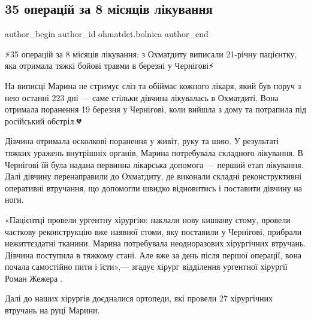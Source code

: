  
 
 
 
 
 
\subsection{35 операцій за 8 місяців лікування}
\label{sec:02_12_2022.fb.ohmatdet.bolnica.1.35_operacij_divchynka}
 
\ifcmt
 author_begin
   author_id ohmatdet.bolnica
 author_end
\fi

⚡️35 операцій за 8 місяців лікування: з Охматдиту виписали 21-річну пацієнтку,
яка отримала тяжкі бойові травми в березні у Чернігові⚡️

На виписці Марина не стримує сліз та обіймає кожного лікаря, який був поруч з
нею останні 223 дні — саме стільки дівчина лікувалась в Охматдиті. Вона
отримала поранення 19 березня у Чернігові, коли вийшла з дому та потрапила під
російський обстріл.💔

Дівчина отримала осколкові поранення у живіт, руку та шию. У результаті тяжких
уражень внутрішніх органів, Марина потребувала складного лікування. В Чернігові
їй була надана первинна лікарська допомога — перший етап лікування. Далі
дівчину перенаправили до Охматдиту, де виконали складні реконструктивні
оперативні втручання, що допомогли швидко відновитись і поставити дівчину на
ноги.🙏🏻

«Пацієнтці провели ургентну хірургію: наклали нову кишкову стому, провели
часткову реконструкцію вже наявної стоми, яку поставили у Чернігові, прибрали
нежиттєздатні тканини. Марина потребувала неодноразових хірургічних втручань.
Дівчина поступила в тяжкому стані. Але вже за день після першої операції, вона
почала самостійно пити і їсти»,— згадує хірург відділення ургентної хірургії
Роман Жежера .💪🏻

Далі до наших хірургів доєдналися ортопеди, які провели 27 хірургічних втручань
на руці Марини.🙌🏻

